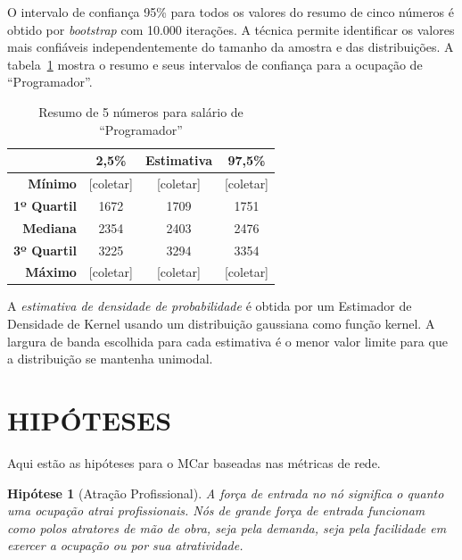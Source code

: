 \documentclass[12pt,a4paper]{article}
\theoremstyle{hypo}
\newtheorem{hypothesis}{Hipótese}
\begin{document}
O intervalo de confiança 95\% para todos os valores do resumo de cinco números é obtido por \textit{bootstrap} com 10.000 iterações. A técnica permite identificar os valores mais confiáveis independentemente do tamanho da amostra e das distribuições. A tabela~\ref{tab:resumo-salario-programador} mostra o resumo e seus intervalos de confiança para a ocupação de \enquote{Programador}.

\begin{table}[htb]
\centering
\begin{tabular}{r|c|c|c}
                    & \textbf{2,5\%} & \textbf{Estimativa} & \textbf{97,5\%} \\ \hline
\textbf{Mínimo}     & [coletar]      & [coletar]           & [coletar] \\ \hline
\textbf{1º Quartil} & 1672           & 1709                & 1751 \\ \hline
\textbf{Mediana}    & 2354           & 2403                & 2476 \\ \hline
\textbf{3º Quartil} & 3225           & 3294                & 3354 \\ \hline
\textbf{Máximo}     & [coletar]      & [coletar]           & [coletar]    
\end{tabular}
\caption{Resumo de 5 números para salário de \enquote{Programador}}
\label{tab:resumo-salario-programador}
\end{table}

A \textit{estimativa de densidade de probabilidade} é obtida por um Estimador de Densidade de Kernel usando um distribuição gaussiana como função kernel. A largura de banda escolhida para cada estimativa é o menor valor limite para que a distribuição se mantenha unimodal.

\section{HIPÓTESES}


Aqui estão as hipóteses para o MCar baseadas nas métricas de rede.

\begin{hypothesis}[Atração Profissional]
A força de entrada no nó significa o quanto uma ocupação atrai profissionais. Nós de grande força de entrada funcionam como polos atratores de mão de obra, seja pela demanda, seja pela facilidade em exercer a ocupação ou por sua atratividade.
\end{hypothesis}
\end{document}
